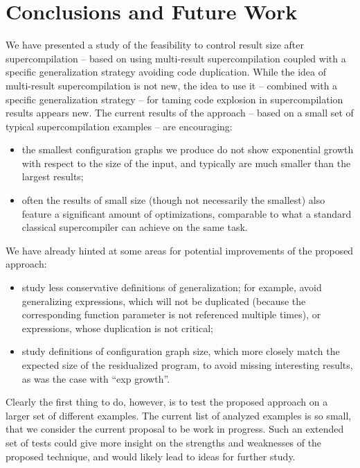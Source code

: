 \documentclass[submission,copyright,creativecommons]{eptcs}
\begin{document}
\section{Conclusions and Future Work}

We have presented a study of the feasibility to control result size after supercompilation
-- based on using multi-result supercompilation coupled with a specific generalization
strategy avoiding code duplication.
While the idea of multi-result supercompilation is not new, the idea to use it -- combined
with a specific generalization strategy -- for taming code explosion in supercompilation results
appears new.
The current results of the approach -- based on a small set of typical supercompilation examples --
are encouraging:
\begin{itemize}
  \item the smallest configuration graphs we produce do not show exponential growth with respect 
    to the size of the input, and typically are much smaller than the largest results;
  \item often the results of small size (though not necessarily the smallest) also feature a
    significant amount of optimizations, comparable to what a standard classical supercompiler
    can achieve on the same task.
\end{itemize}

We have already hinted at some areas for potential improvements of the proposed approach:
\begin{itemize}
  \item study less conservative definitions of generalization; for example, avoid generalizing
    expressions, which will not be duplicated (because the corresponding function parameter is
    not referenced multiple times), or expressions, whose duplication is not critical;
  \item study definitions of configuration graph size, which more closely match the expected
    size of the residualized program, to avoid missing interesting results, as was the case
    with ``exp growth''.
\end{itemize}
Clearly the first thing to do, however, is to test the proposed approach on a larger set of
different examples.
The current list of analyzed examples is so small, that we consider the current proposal
to be work in progress.
Such an extended set of tests could give more insight on the strengths and weaknesses of the 
proposed technique, and would likely lead to ideas for further study.
\end{document}

